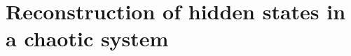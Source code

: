 \documentclass[runningheads]{llncs}
\begin{document}



\section{Reconstruction of hidden states in a chaotic system}

\label{sec:Results}
\end{document}
